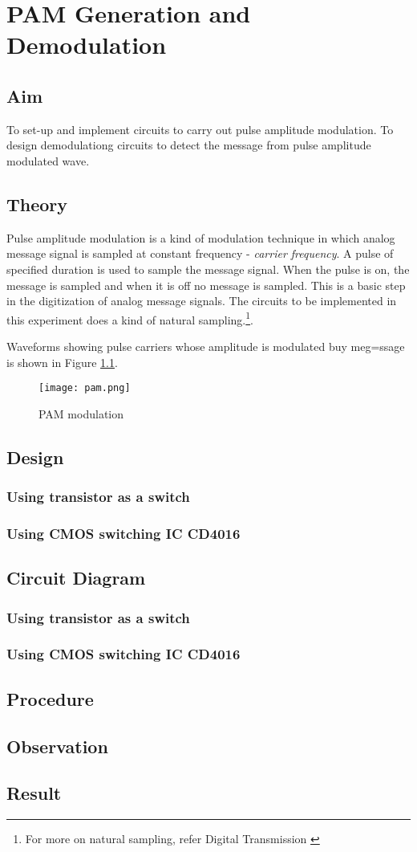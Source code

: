 \chapter[PAM Generation and Demodulation]{PAM Generation and Demodulation}

\section*{Aim}
To set-up and implement circuits to carry out pulse amplitude modulation. To design demodulationg circuits to detect the message from pulse amplitude modulated wave.
\section*{Theory}
Pulse amplitude modulation is a kind of modulation technique in which analog message signal is sampled at constant frequency - \emph{carrier frequency}. A pulse of specified duration is used to sample the message signal. When the pulse is on, the message is sampled and when it is off no message is sampled. This is a basic step in the digitization of analog message signals. The circuits to be implemented in this experiment does a kind of natural sampling.\footnote{For more on natural sampling, refer Digital Transmission \cite{Tomasi}}.

Waveforms showing pulse carriers whose amplitude is modulated buy meg=ssage is shown in Figure \ref{PAMmod}.
\begin{figure}[h]
\texttt{[image: pam.png]}
\caption{PAM modulation}
\label{PAMmod}
\end{figure}
\section*{Design}
\subsection*{Using transistor as a switch}
\subsection*{Using CMOS switching IC CD4016}

\section*{Circuit Diagram}
\subsection*{Using transistor as a switch}
\subsection*{Using CMOS switching IC CD4016}

\section*{Procedure}
\section*{Observation}
\section*{Result}